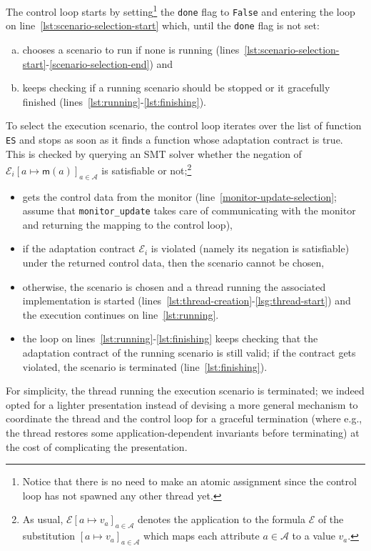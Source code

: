 The control loop starts by setting\footnote{%
  Notice that there is no need to make an atomic assignment since the
  control loop has not spawned any other thread yet.
%
} the \lstinline[style=pyinl]{done}
flag to \lstinline[style=pyinl]{False}
and entering the loop on line~\ref{lst:scenario-selection-start} which,
until the \lstinline[style=pyinl]{done} flag is not set:
\begin{enumerate}[a.]
\item chooses a scenario to run if none is running
  (lines~\ref{lst:scenario-selection-start}-\ref{scenario-selection-end})
  and
\item keeps checking if a running scenario should be stopped or it
  gracefully finished (lines~\ref{lst:running}-\ref{lst:finishing}).
\end{enumerate}
% 
To select the execution scenario, the control loop iterates over
the list of function \lstinline[style=pyinl]{ES} and stops
as soon as it finds a function whose adaptation contract is true.
%
This is checked by querying an SMT solver whether the negation of
$\mathcal{E}_i[a \mapsto \mathsf{m}(a)]_{a \in \mathcal{A}}$ is
satisfiable or not;\footnote{%
  As usual, $\mathcal{E}[a \mapsto v_a]_{a \in \mathcal{A}}$ denotes the
  application to the formula $\mathcal{E}$ of the substitution
  $[a \mapsto v_a]_{a \in \mathcal{A}}$ which maps each
  attribute $a \in \mathcal{A}$ to a value $v_a$.
}
\begin{itemize}
\item gets the control data from the monitor (line~\ref{monitor-update-selection};
  assume that \lstinline[style=pyinl]{monitor_update} takes
  care of communicating with the monitor and returning the mapping
  to the control loop),
\item if the adaptation contract $\mathcal{E}_i$
  is violated (namely its negation is satisfiable)
  under the returned control data, then the scenario cannot be chosen,
\item otherwise, the scenario is chosen and a thread running the associated implementation
  is started (lines~\ref{lst:thread-creation}-\ref{lsg:thread-start})
  and the execution continues on line~\ref{lst:running}.
\item the loop on lines~\ref{lst:running}-\ref{lst:finishing} keeps
  checking that the adaptation contract of the running scenario is
  still valid; if the contract gets violated, the scenario is
  terminated (line~\ref{lst:finishing}).
\end{itemize}

For simplicity, the thread running the execution scenario is
terminated; we indeed opted for a lighter presentation instead of
devising a more general mechanism to coordinate the thread and the
control loop for a graceful termination (where e.g., the thread
restores some application-dependent invariants before terminating) at
the cost of complicating the presentation.


